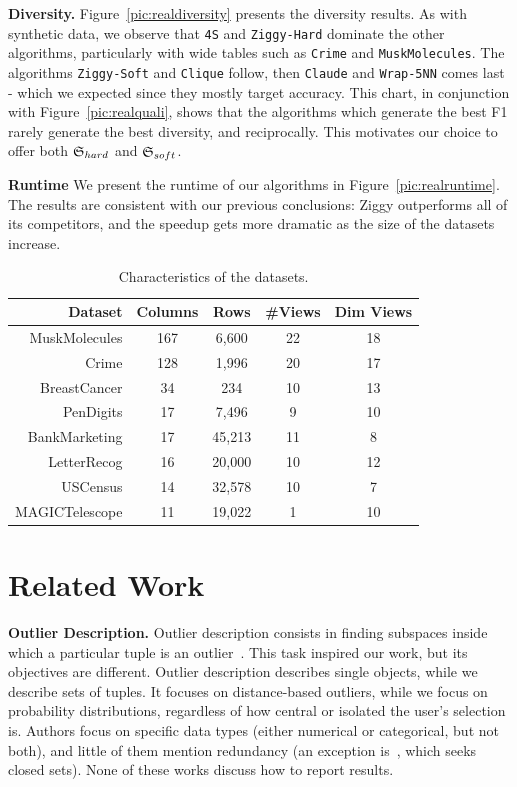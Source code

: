 \textbf{Diversity.} Figure~\ref{pic:realdiversity} presents the diversity
results.  As with synthetic data, we observe that \texttt{4S} and
\texttt{Ziggy-Hard} dominate the other algorithms, particularly with wide
tables such as \texttt{Crime} and \texttt{MuskMolecules}. The algorithms
\texttt{Ziggy-Soft} and \texttt{Clique} follow, then \texttt{Claude} and
\texttt{Wrap-5NN} comes last - which we expected since they mostly target
accuracy. This chart, in conjunction with Figure~\ref{pic:realquali}, shows
that the algorithms which generate the best F1 rarely generate the best
diversity, and reciprocally. This motivates our choice to offer both
$\mathfrak{S}_{hard}$ and $\mathfrak{S}_{soft}$.

\textbf{Runtime} We present the runtime of our algorithms in
Figure~\ref{pic:realruntime}. The results are consistent with our previous
conclusions: Ziggy outperforms all of its competitors, and the speedup gets more
dramatic as the size of the datasets increase.

\begin{table}[!t]
    \centering
    \small
    \begin{tabular}{r c c c c} 
        \hline
        Dataset & Columns & Rows & \#Views & Dim Views\\
        \hline
        MuskMolecules & 167 & 6,600 & 22 & 18\\
        Crime & 128 & 1,996 & 20 & 17\\
        BreastCancer & 34 & 234 & 10 & 13\\
        PenDigits & 17 & 7,496 & 9 & 10\\
        BankMarketing & 17 & 45,213 & 11& 8\\
        LetterRecog & 16 & 20,000 & 10 & 12\\
        USCensus & 14 & 32,578 & 10 & 7\\
        MAGICTelescope & 11 & 19,022 & 1 & 10\\
        \hline
    \end{tabular}
    \caption{Characteristics of the datasets.}
    \label{tab:datasets}
\end{table}

\section{Related Work}
\label{sec:related-works}

\textbf{Outlier Description.} Outlier description consists in finding subspaces
inside which a particular tuple is an outlier~\cite{angiulli2009detecting,
duan2014mining,knorr1999finding,zhang2006detecting}. This task inspired our
work, but its objectives are different. Outlier description describes single
objects, while we describe sets of tuples.  It focuses on distance-based
outliers, while we focus on probability distributions, regardless of how
central or isolated the user's selection is.  Authors focus on specific data
types (either numerical or categorical, but not both), and little of them
mention redundancy (an exception is~\cite{duan2014mining}, which seeks closed
sets). None of these works discuss how to report results.

